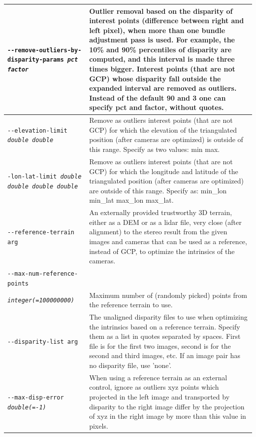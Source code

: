 \begin{longtable}{|p{8cm}|p{9cm}|}
\texttt{-\/-remove-outliers-by-disparity-params \textit{pct factor}} &
Outlier removal based on the disparity of interest points (difference between right and left pixel), when more than one bundle adjustment pass is used. For example, the 10\% and 90\% percentiles of disparity are computed, and this interval is made three times bigger. Interest points (that are not GCP) whose disparity fall outside the expanded interval are removed as outliers. Instead of the default 90 and 3 one can specify pct and factor, without quotes.\\ \hline

\texttt{-\/-elevation-limit \textit{double double}} &
Remove as outliers interest points (that are not GCP) for which the elevation of the triangulated position (after cameras are optimized) is outside of this range. Specify as two values: min max.
\\ \hline

\texttt{-\/lon-lat-limit \textit{double double double double}} &
Remove as outliers interest points (that are not GCP) for which the longitude and latitude of the triangulated position (after cameras are optimized) are outside of this range. Specify as: min\_lon min\_lat max\_lon max\_lat.
\\ \hline

\texttt{-\/-reference-terrain arg} & An externally provided trustworthy 3D terrain, either as a DEM or as a lidar file, very close (after alignment) to the stereo result from the given images and cameras that can be used as a reference, instead of GCP, to optimize the intrinsics of the cameras. \\ \hline

\texttt{-\/-max-num-reference-points} \\
\texttt{\textit{integer(=100000000)}}   & Maximum number of (randomly picked) points from the reference terrain to use.\\ \hline

\texttt{-\/-disparity-list arg} & The unaligned disparity files to use when optimizing the intrinsics based on a reference terrain. Specify them as a list in quotes separated by spaces. First file is for the first two images, second is for the second and third images, etc. If an image pair has no disparity file, use 'none'. \\ \hline

\texttt{-\/-max-disp-error \textit{double(=-1)}} & When using a reference terrain as an external control, ignore as outliers xyz points which projected in the left image and transported by disparity to the right image differ by the projection of xyz in the right image by more than this value in pixels.\\ \hline


\end{longtable}
